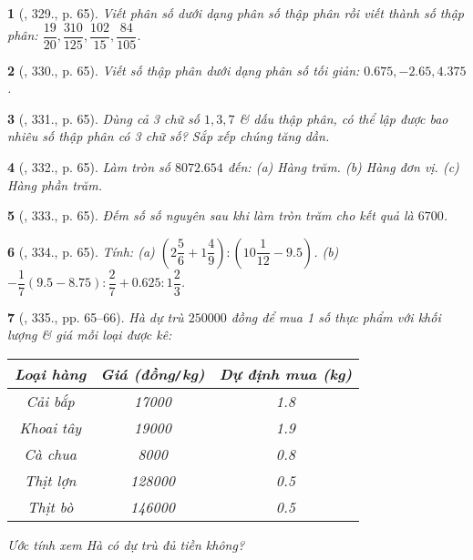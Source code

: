 \documentclass{article}
\newtheorem{baitoan}{}
\begin{document}
\begin{baitoan}[\cite{Tuyen_Toan_6}, 329., p. 65]
	Viết phân số dưới dạng phân số thập phân rồi viết thành số thập phân: $\dfrac{19}{20},\dfrac{310}{125},\dfrac{102}{15},\dfrac{84}{105}$.
\end{baitoan}

\begin{baitoan}[\cite{Tuyen_Toan_6}, 330., p. 65]
	Viết số thập phân dưới dạng phân số tối giản: $0.675,-2.65,4.375$.
\end{baitoan}

\begin{baitoan}[\cite{Tuyen_Toan_6}, 331., p. 65]
	Dùng cả 3 chữ số $1,3,7$ \& dấu thập phân, có thể lập được bao nhiêu số thập phân có 3 chữ số? Sắp xếp chúng tăng dần.
\end{baitoan}

\begin{baitoan}[\cite{Tuyen_Toan_6}, 332., p. 65]
	Làm tròn số $8072.654$ đến: (a) Hàng trăm. (b) Hàng đơn vị. (c) Hàng phần trăm.
\end{baitoan}

\begin{baitoan}[\cite{Tuyen_Toan_6}, 333., p. 65]
	Đếm số số nguyên sau khi làm tròn trăm cho kết quả là $6700$.
\end{baitoan}

\begin{baitoan}[\cite{Tuyen_Toan_6}, 334., p. 65]
	Tính: (a) $\left(2\dfrac{5}{6} + 1\dfrac{4}{9}\right):\left(10\dfrac{1}{12} - 9.5\right)$. (b) $-\dfrac{1}{7}(9.5 - 8.75):\dfrac{2}{7} + 0.625:1\dfrac{2}{3}$.
\end{baitoan}

\begin{baitoan}[\cite{Tuyen_Toan_6}, 335., pp. 65--66]
	Hà dự trù $250000$ đồng để mua 1 số thực phẩm với khối lượng \& giá mỗi loại được kê:
	\begin{table}[H]
		\centering
		\begin{tabular}{|c|c|c|}
			\hline
			Loại hàng & Giá (đồng{\tt/}kg) & Dự định mua (kg) \\
			\hline
			Cải bắp & 17000 & 1.8 \\
			\hline
			Khoai tây & 19000 & 1.9 \\
			\hline
			Cà chua & 8000 & 0.8 \\
			\hline
			Thịt lợn & 128000 & 0.5 \\
			\hline
			Thịt bò & 146000 & 0.5 \\
			\hline
		\end{tabular}
	\end{table}
	Ước tính xem Hà có dự trù đủ tiền không?
\end{baitoan}
\end{document}
